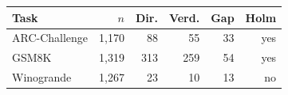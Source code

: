 \begin{tabular}{lrrrrr}
\toprule
Task & $n$ & Dir. & Verd. & Gap & Holm \\
\midrule
ARC-Challenge & 1,170 & 88 & 55 & 33 & yes \\
GSM8K & 1,319 & 313 & 259 & 54 & yes \\
Winogrande & 1,267 & 23 & 10 & 13 & no \\
\bottomrule
\end{tabular}
